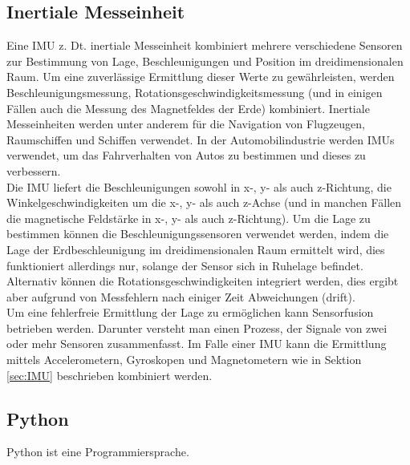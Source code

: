 \subsection{Inertiale Messeinheit}
\label{subsec:tIMU}
Eine \ac{IMU} z. Dt. inertiale Messeinheit kombiniert mehrere verschiedene Sensoren zur Bestimmung von Lage, Beschleunigungen und Position im dreidimensionalen Raum. Um eine zuverlässige Ermittlung dieser Werte zu gewährleisten, werden Beschleunigungsmessung, Rotationsgeschwindigkeitsmessung (und in einigen Fällen auch die Messung des Magnetfeldes der Erde) kombiniert. Inertiale Messeinheiten werden unter anderem für die Navigation von Flugzeugen, Raumschiffen und Schiffen verwendet. In der Automobilindustrie werden \ac{IMU}s verwendet, um das Fahrverhalten von Autos zu bestimmen und dieses zu verbessern.\\
Die \ac{IMU} liefert die Beschleunigungen sowohl in x-, y- als auch z-Richtung, die Winkelgeschwindigkeiten um die x-, y- als auch z-Achse (und in manchen Fällen die magnetische Feldstärke in x-, y- als auch z-Richtung). Um die Lage zu bestimmen können die Beschleunigungssensoren verwendet werden, indem die Lage der Erdbeschleunigung im dreidimensionalen Raum ermittelt wird, dies funktioniert allerdings nur, solange der Sensor sich in Ruhelage befindet. Alternativ können die Rotationsgeschwindigkeiten integriert werden, dies ergibt aber aufgrund von Messfehlern nach einiger Zeit Abweichungen (drift).\\ Um eine fehlerfreie Ermittlung der Lage zu ermöglichen kann Sensorfusion betrieben werden. Darunter versteht man einen Prozess, der Signale von zwei oder mehr Sensoren zusammenfasst. Im Falle einer \ac{IMU} kann die Ermittlung mittels Accelerometern, Gyroskopen und Magnetometern wie in Sektion \ref{sec:IMU} beschrieben kombiniert werden. %
\cite{UCAM-CL-TR-696}

\subsection{Python}
\label{subsec:tPython}
Python ist eine Programmiersprache.

